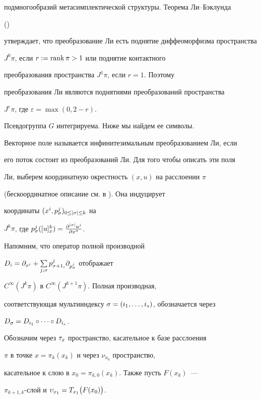 подмногообразий метасимплектической структуры. Теорема Ли--Бэклунда


(\cite{KLV})


утверждает, что преобразование Ли есть поднятие диффеоморфизма пространства


$J^0\pi$, если $r:=\operatorname{rank}\pi>1$ или поднятие контактного


преобразования пространства $J^1\pi$, если $r=1$. Поэтому


преобразования Ли являются поднятиями преобразований пространства


$J^\varepsilon\pi$, где $\varepsilon=\max(0,2-r)$.





Псевдогруппа $G$ интегрируема. Ниже мы найдем ее символы.





Векторное поле называется инфинитезимальным преобразованием Ли, если


его поток состоит из преобразований Ли. Для того чтобы описать эти поля


Ли, выберем координатную окрестность $(x,u)$ на расслоении $\pi$


(бескоординатное описание см. в \cite{KLV}). Она индуцирует


координаты $(x^i,p^j_\sigma)_{0\le|\sigma|\le k}$ на


$J^k\pi$, где $p^j_\sigma([u]_x^k)=\frac{\partial^{|\sigma|}u^j}{\partial x^\sigma}$.





Напомним, что оператор полной производной


$D_i=\partial_{x^i}+\sum\limits_{j;\sigma}p^j_{\sigma+1_i}\partial_{p_\sigma^j}$ отображает


$C^\infty(J^k\pi)$ в $C^\infty(J^{k+1}\pi)$. Полная производная,


соответствующая мультииндексу $\sigma=(i_1,\dots,i_s)$, обозначается через


$D_\sigma=D_{i_1}\circ\dotsb\circ D_{i_s}$.





Обозначим через $\tau_x$ пространство, касательное к базе расслоения


$\pi$ в точке $x=\pi_k(x_k)$ и через $\nu_{x_0}$ пространство,


касательное к слою в $x_0=\pi_{k,0}(x_k)$. Также пусть  $F(x_k)$~---


$\pi_{k+1,k}$-слой и $\upsilon_{x_1}=T_{x_1}\big(F(x_0)\big)$.


